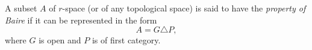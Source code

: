 A subset $A$ of $r$-space (or of any topological space) is said to have the \emph{property of Baire} if it can be represented in the form
$$A = G \triangle P,$$
where $G$ is open and $P$ is of first category.
